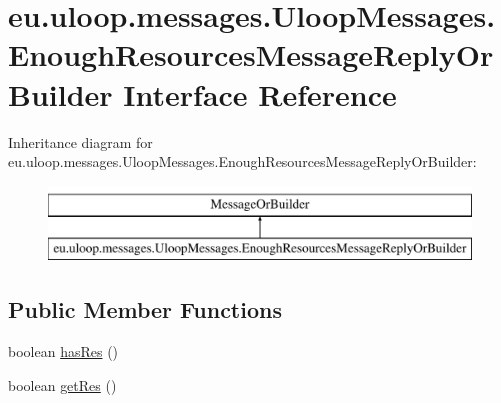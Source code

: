 \hypertarget{interfaceeu_1_1uloop_1_1messages_1_1UloopMessages_1_1EnoughResourcesMessageReplyOrBuilder}{\section{eu.\+uloop.\+messages.\+Uloop\+Messages.\+Enough\+Resources\+Message\+Reply\+Or\+Builder Interface Reference}
\label{interfaceeu_1_1uloop_1_1messages_1_1UloopMessages_1_1EnoughResourcesMessageReplyOrBuilder}
}
Inheritance diagram for eu.\+uloop.\+messages.\+Uloop\+Messages.\+Enough\+Resources\+Message\+Reply\+Or\+Builder\+:\begin{figure}[H]
\begin{center}
\leavevmode
\includegraphics[height=2.000000cm]{interfaceeu_1_1uloop_1_1messages_1_1UloopMessages_1_1EnoughResourcesMessageReplyOrBuilder}
\end{center}
\end{figure}
\subsection*{Public Member Functions}
\begin{DoxyCompactItemize}
\item 
boolean \hyperlink{interfaceeu_1_1uloop_1_1messages_1_1UloopMessages_1_1EnoughResourcesMessageReplyOrBuilder_a980a1af33fe496b4ef122b0233d82052}{has\+Res} ()
\item 
boolean \hyperlink{interfaceeu_1_1uloop_1_1messages_1_1UloopMessages_1_1EnoughResourcesMessageReplyOrBuilder_a7720d29323e2998eb7a72bb40dd876dc}{get\+Res} ()
\end{DoxyCompactItemize}


